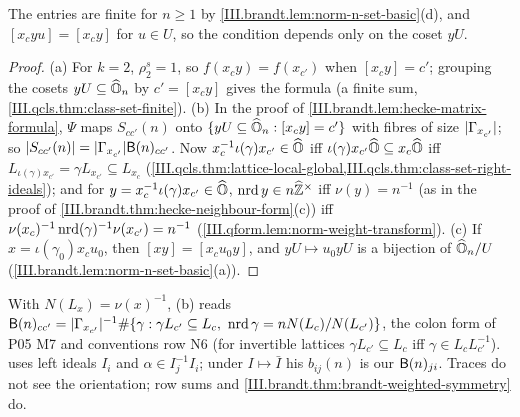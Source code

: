 \begin{definition}
\end{definition}
\noindent The entries are finite for $n\ge1$ by \cref{III.brandt.lem:norm-n-set-basic}(d), and $[x_cyu]=[x_cy]$ for $u\in U$, so the condition depends only on
the coset $yU$.

\begin{theorem}
\end{theorem}
\begin{proof}
(a) For $k=2$, $\rho_2^s=1$, so $f(x_cy)=f(x_{c'})$ when $[x_cy]=c'$; grouping the cosets $yU\subseteq\widehat{\mathbb{O}}_n$ by $c'=[x_cy]$ gives the formula (a finite sum,
\cref{III.qcls.thm:class-set-finite}). (b) In the proof of \cref{III.brandt.lem:hecke-matrix-formula}, $\Psi$ maps $S_{cc'}(n)$ onto
$\{yU\subseteq\widehat{\mathbb{O}}_n:[x_cy]=c'\}$ with fibres of size $\lvert\Gamma_{x_{c'}}\rvert$; so $\lvert S_{cc'}(n)\rvert=\lvert\Gamma_{x_{c'}}\rvert\mathsf{B}(n)_{cc'}$. Now
$x_c^{-1}\iota(\gamma)x_{c'}\in\widehat{\mathbb{O}}$ iff $\iota(\gamma)x_{c'}\widehat{\mathbb{O}}\subseteq x_c\widehat{\mathbb{O}}$ iff $L_{\iota(\gamma)x_{c'}}=\gamma L_{x_{c'}}\subseteq L_{x_c}$
(\cref{III.qcls.thm:lattice-local-global,III.qcls.thm:class-set-right-ideals}); and for $y=x_c^{-1}\iota(\gamma)x_{c'}\in\widehat{\mathbb{O}}$, $\operatorname{nrd} y\in n\widehat{\mathbb{Z}}^\times$ iff
$\nu(y)=n^{-1}$ (as in the proof of \cref{III.brandt.thm:hecke-neighbour-form}(c)) iff $\nu(x_c)^{-1}\operatorname{nrd}(\gamma)^{-1}\nu(x_{c'})=n^{-1}$
(\cref{III.qform.lem:norm-weight-transform}). (c) If $x=\iota(\gamma_0)x_cu_0$, then $[xy]=[x_cu_0y]$, and $yU\mapsto u_0yU$ is a bijection of
$\widehat{\mathbb{O}}_n/U$ (\cref{III.brandt.lem:norm-n-set-basic}(a)).
\end{proof}

\begin{remark}[dictionary]\label{rem:brandt-dictionary}
With $N(L_x)=\nu(x)^{-1}$, (b) reads $\mathsf{B}(n)_{cc'}=\lvert\Gamma_{x_{c'}}\rvert^{-1}\#\{\gamma:\gamma L_{c'}\subseteq L_c,\ \operatorname{nrd}\gamma=nN(L_c)/N(L_{c'})\}$, the colon form of
P05 M7 and conventions row N6 (for invertible lattices $\gamma L_{c'}\subseteq L_c$ iff $\gamma\in L_cL_{c'}^{-1}$). \cite[Def.~2.13]{Piz} uses left ideals
$I_i$ and $\alpha\in I_j^{-1}I_i$; under $I\mapsto\bar I$ his $b_{ij}(n)$ is our $\mathsf{B}(n)_{ji}$. Traces do not see the orientation; row sums and
\cref{III.brandt.thm:brandt-weighted-symmetry} do.
\end{remark}

